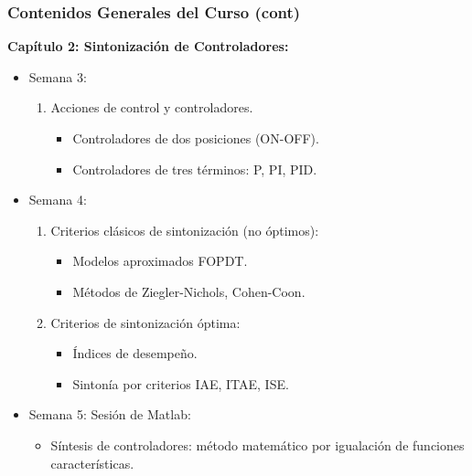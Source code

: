 \documentclass[aspectratio=169,handout]{beamer}
\theoremstyle{definition}
\theoremstyle{plain}
\theoremstyle{remark}
\newcounter{saveenumi}
\newcommand{\seti}{\setcounter{saveenumi}{\value{enumi}}}
\newcommand{\conti}{\setcounter{enumi}{\value{saveenumi}}}
\begin{document}
\begin{frame}[<+->]\frametitle{Contenidos Generales del Curso (cont)}
\textbf{Capítulo 2: Sintonización de Controladores:}
\begin{itemize}
  \conti
  \item Semana 3:
  \begin{enumerate}
    \item Acciones de control y controladores.
    \begin{itemize}
      \item Controladores de dos posiciones (ON-OFF).
      \item Controladores de tres términos: P, PI, PID.
    \end{itemize}
  \end{enumerate}
  \item Semana 4:
  \begin{enumerate}
    \item Criterios clásicos de sintonización (no óptimos):
    \begin{itemize}
      \item Modelos aproximados FOPDT.
      \item Métodos de Ziegler-Nichols, Cohen-Coon.
    \end{itemize}
    \item Criterios de sintonización óptima:
    \begin{itemize}
      \item Índices de desempeño.
      \item Sintonía por criterios IAE, ITAE, ISE.
    \end{itemize}
  \end{enumerate}
  \item Semana 5: Sesión de Matlab:
  \begin{itemize}
    \item Síntesis de controladores: método matemático por igualación de funciones características.
  \end{itemize}
  \seti
\end{itemize}
\end{frame}
\end{document}

